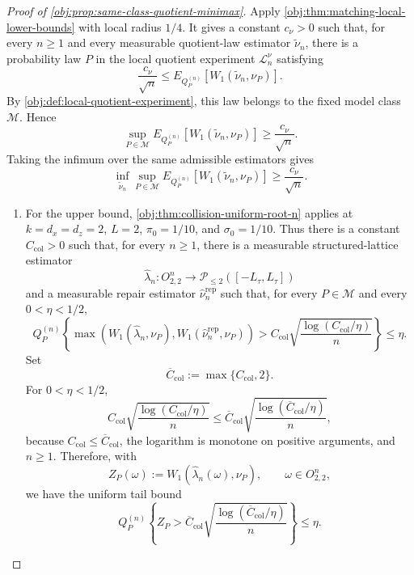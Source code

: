 \begin{proof}[Proof of \cref{obj:prop:same-class-quotient-minimax}]
Apply \cref{obj:thm:matching-local-lower-bounds} with local radius \(1/4\). It gives a constant \(c_{\nu}>0\) such that, for every \(n\ge 1\) and every measurable quotient-law estimator \(\widetilde\nu_n\), there is a probability law \(P\) in the local quotient experiment \(\mathcal L_n^\nu\) satisfying
\[
  \frac{c_{\nu}}{\sqrt n}
  \le
  E_{Q_P^{(n)}}\!\left[
    W_1\!\left(\widetilde\nu_n,\nu_P\right)
  \right].
\]
By \cref{obj:def:local-quotient-experiment}, this law belongs to the fixed model class \(\mathcal M\). Hence
\[
  \sup_{P\in\mathcal M}
  E_{Q_P^{(n)}}\!\left[
    W_1\!\left(\widetilde\nu_n,\nu_P\right)
  \right]
  \ge
  \frac{c_{\nu}}{\sqrt n}.
\]
Taking the infimum over the same admissible estimators gives
\[
  \inf_{\widetilde\nu_n}
  \sup_{P\in\mathcal M}
  E_{Q_P^{(n)}}\!\left[
    W_1\!\left(\widetilde\nu_n,\nu_P\right)
  \right]
  \ge
  \frac{c_{\nu}}{\sqrt n}.
\]

\begin{enumerate}
\item
For the upper bound, \cref{obj:thm:collision-uniform-root-n} applies at
\(k=d_x=d_z=2\), \(L=2\), \(\pi_0=1/10\), and \(\sigma_0=1/10\). Thus there is a constant \(C_{\mathrm{col}}>0\) such that, for every \(n\ge 1\), there is a measurable structured-lattice estimator
\[
  \widehat\lambda_n:O_{2,2}^n\to
  \mathcal P_{\le 2}([-L_\tau,L_\tau])
\]
and a measurable repair estimator \(\widehat\nu_n^{\mathrm{rep}}\) such that, for every \(P\in\mathcal M\) and every \(0<\eta<1/2\),
\[
  Q_P^{(n)}\!\left\{
    \max\!\left(
      W_1(\widehat\lambda_n,\nu_P),
      W_1(\widehat\nu_n^{\mathrm{rep}},\nu_P)
    \right)
    >
    C_{\mathrm{col}}
    \sqrt{\frac{\log(C_{\mathrm{col}}/\eta)}{n}}
  \right\}
  \le \eta .
\]
Set
\[
  \overline C_{\mathrm{col}}:=\max\{C_{\mathrm{col}},2\}.
\]
For \(0<\eta<1/2\),
\[
  C_{\mathrm{col}}
  \sqrt{\frac{\log(C_{\mathrm{col}}/\eta)}{n}}
  \le
  \overline C_{\mathrm{col}}
  \sqrt{\frac{\log(\overline C_{\mathrm{col}}/\eta)}{n}},
\]
because \(C_{\mathrm{col}}\le\overline C_{\mathrm{col}}\), the logarithm is monotone on positive arguments, and \(n\ge1\). Therefore, with
\[
  Z_P(\omega):=
  W_1\!\left(\widehat\lambda_n(\omega),\nu_P\right),
  \qquad \omega\in O_{2,2}^n,
\]
we have the uniform tail bound
\[
  Q_P^{(n)}\!\left\{
    Z_P>
    \overline C_{\mathrm{col}}
    \sqrt{\frac{\log(\overline C_{\mathrm{col}}/\eta)}{n}}
  \right\}
  \le \eta .
\]


\end{enumerate}
\end{proof}
